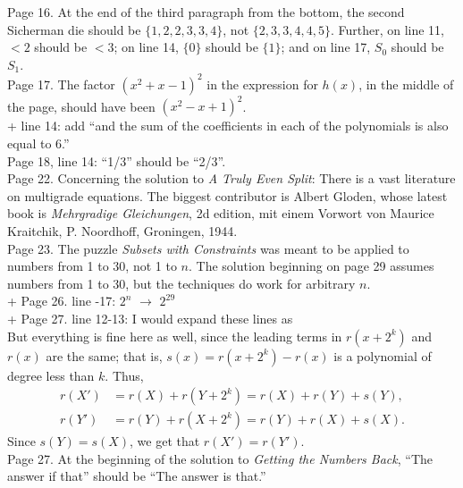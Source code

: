\documentclass[11pt]{article}
\begin{document}
Page 16. At the end of the third paragraph from the bottom, the
second Sicherman die should be $\{1,2,2,3,3,4\}$, not $\{2,3,3,4,4,5\}$.
Further, on line 11, $<2$ should be $<3$; on line 14,
$\{0\}$ should be $\{1\}$; and on line 17, $S_0$ should be $S_1$.\\

Page 17. The factor $(x^2+x-1)^2$ in the expression for $h(x)$, in the middle
of the page, should have been $(x^2-x+1)^2$.\\

+ line 14: add ``and the sum of the coefficients in each of the polynomials is also equal to 6.''\\

Page 18, line 14: ``1/3'' should be ``2/3''.\\

Page 22. Concerning the solution to {\em A Truly Even Split}:
There is a vast literature on multigrade equations.
The biggest contributor is Albert Gloden, whose latest book
is {\em Mehrgradige Gleichungen}, 2d edition, mit einem Vorwort von Maurice Kraitchik,
P. Noordhoff, Groningen, 1944.\\

Page 23.  The puzzle {\em Subsets with Constraints}
was meant to be applied to numbers from 1 to 30,
not 1 to $n$.  The solution beginning on page 29 assumes
numbers from 1 to 30, but the techniques do work for arbitrary $n$.\\

+ Page 26. line -17: $2^n$ $\to$ $2^{29}$\\

+ Page 27. line 12-13: I would expand these lines as \\

But everything is fine here as well, since the leading terms in \( r(x+2^k) \) and \( r(x) \) are the same;
that is, \( s(x) = r(x+2^k) - r(x) \) is a polynomial of degree less than \( k \).
Thus,
\begin{align*}
r(X') &= r(X) + r(Y + 2^k) = r(X) + r(Y) + s(Y), \\
r(Y') &= r(Y) + r(X + 2^k) = r(Y) + r(X) + s(X).
\end{align*}
Since \( s(Y) = s(X) \), we get that \( r(X') = r(Y') \).
\\

Page 27. At the beginning of the solution to {\em Getting the Numbers Back},
``The answer if that'' should be ``The answer is that.''\\
\end{document}
